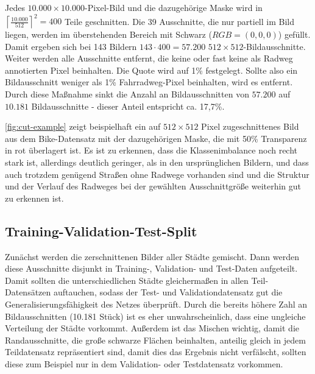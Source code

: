 Jedes $10.000\times 10.000$-Pixel-Bild und die dazugehörige Maske wird in 
$\left\lceil{\frac{10.000}{512}}\right\rceil^2 = 400$ Teile geschnitten. 
Die 39 Ausschnitte, die nur partiell im Bild liegen, werden im überstehenden Bereich mit Schwarz ($RGB=(0,0,0)$) gefüllt.
Damit ergeben sich bei 143 Bildern $143 \cdot 400 = 57.200$ $512 \times 512$-Bildausschnitte. \\
Weiter werden alle Ausschnitte entfernt, die keine oder fast keine als Radweg annotierten Pixel beinhalten. 
Die Quote wird auf 1\% festgelegt. Sollte also ein Bildausschnitt weniger als 1\% Fahrradweg-Pixel beinhalten, 
wird es entfernt. Durch diese Maßnahme sinkt die Anzahl an Bildausschnitten von $57.200$ auf $10.181$ Bildausschnitte - 
dieser Anteil entspricht ca. 17,7\%. 
 
\autoref{fig:cut-example} zeigt beispielhaft ein auf $512\times 512$ Pixel zugeschnittenes Bild aus dem Bike-Datensatz 
mit der dazugehörigen Maske, die mit 50\% Transparenz in rot überlagert ist. Es ist zu erkennen, 
dass die Klassenimbalance noch recht stark ist, allerdings deutlich geringer, als in den ursprünglichen Bildern,
und dass auch trotzdem genügend Straßen ohne Radwege vorhanden sind und die Struktur und der Verlauf des Radweges 
bei der gewählten Ausschnittgröße weiterhin gut zu erkennen ist. 

\subsection{Training-Validation-Test-Split}

Zunächst werden die zerschnittenen Bilder aller Städte gemischt. Dann werden diese Ausschnitte disjunkt in 
Training-, Validation- und Test-Daten aufgeteilt. 
Damit sollten die unterschiedlichen Städte gleichermaßen in allen Teil-Datensätzen auftauchen, 
sodass der Test- und Validationdatensatz gut die Generalisierungsfähigkeit des Netzes überprüft. 
Durch die bereits höhere Zahl an Bildausschnitten (10.181 Stück) ist es eher unwahrscheinlich, 
dass eine ungleiche Verteilung der Städte vorkommt. Außerdem ist das Mischen wichtig, 
damit die Randausschnitte, die große schwarze Flächen beinhalten, anteilig gleich in 
jedem Teildatensatz repräsentiert sind, damit dies das Ergebnis nicht verfälscht, sollten diese 
zum Beispiel nur in dem Validation- oder Testdatensatz vorkommen. 

